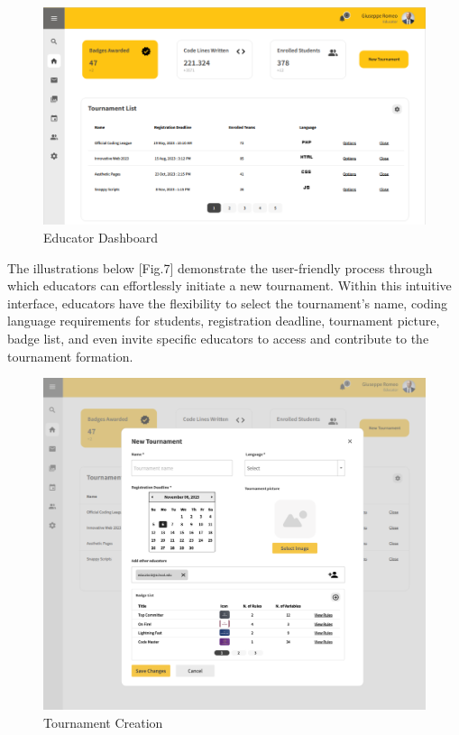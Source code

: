 \documentclass[12pt,oneside,a4paper]{article}
\begin{document}
\begin{figure}[htbp]
    \centering
    \includegraphics[width=1\linewidth]{Images/Interfaces/Educator Interfaces/EducatorDashboard.PNG}
    \caption{Educator Dashboard}
    \label{fig:enter-label}
\end{figure}

\pagebreak

\begin{flushleft}
The illustrations below [Fig.7] demonstrate the user-friendly process through which educators can effortlessly initiate a new tournament. Within this intuitive interface, educators have the flexibility to select the tournament's name, coding language requirements for students, registration deadline, tournament picture, badge list, and even invite specific educators to access and contribute to the tournament formation.    
\end{flushleft}

\begin{figure}[htbp]
    \centering
    \includegraphics[width=1\linewidth]{Images/Interfaces/Educator Interfaces/CreateTournament.png}
    \caption{Tournament Creation}
    \label{fig:enter-label}
\end{figure}
\end{document}
